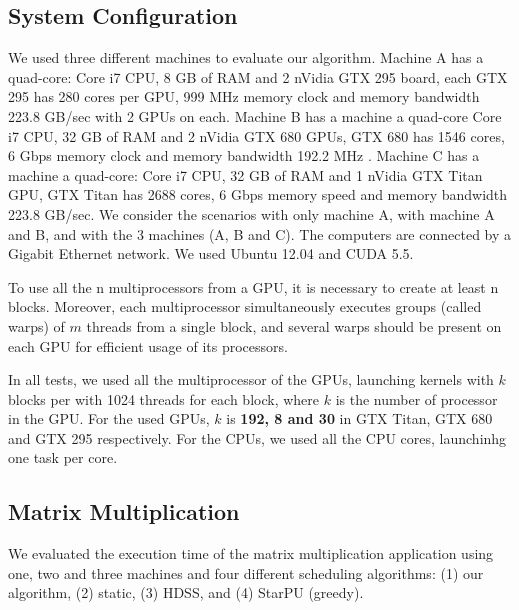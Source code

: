 \documentclass[journal]{IEEEtran}
\begin{document}
\subsection{System Configuration}

We used three different machines to evaluate our algorithm. Machine A has a
quad-core: Core i7 CPU, 8 GB of RAM and 2 nVidia GTX 295 board, each GTX 295 has
280 cores per GPU, 999 MHz memory clock and memory bandwidth 223.8 GB/sec with 2
GPUs on each. Machine B has a machine a quad-core Core i7 CPU, 32 GB of RAM and
2 nVidia GTX 680 GPUs, GTX 680 has 1546 cores, 6 Gbps memory clock and memory
bandwidth 192.2 MHz .  Machine C has a machine a quad-core: Core i7 CPU, 32 GB
of RAM and 1 nVidia GTX Titan GPU, GTX Titan has 2688 cores, 6 Gbps memory speed
and memory bandwidth 223.8 GB/sec. We consider the scenarios with only machine
A, with machine A and B, and with the 3 machines (A, B and C). The computers are
connected by a Gigabit Ethernet network. We used Ubuntu 12.04 and CUDA 5.5.

To use all the n multiprocessors from a GPU, it is necessary to create at least
n blocks. Moreover, each multiprocessor simultaneously executes groups (called
warps) of $m$ threads from a single block, and several warps should be present
on each GPU for efficient usage of its processors.

In all tests, we used all the multiprocessor of the GPUs, launching kernels with
$k$ blocks per with 1024 threads for each block, where $k$ is the number of
processor in the GPU. For the used GPUs, $k$ is \textbf{192, 8 and 30} in GTX
Titan, GTX 680 and GTX 295 respectively. For the CPUs, we used all the CPU
cores, launchinhg one task per core.


\subsection{Matrix Multiplication}

We evaluated the execution time of the matrix multiplication application using
one, two and three machines and four different scheduling algorithms: (1) our
algorithm, (2) static, (3) HDSS, and (4) StarPU (greedy). 
\end{document}
